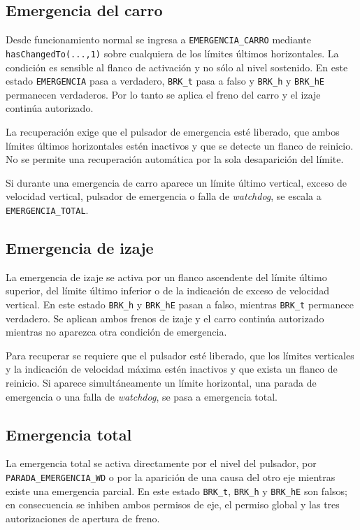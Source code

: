 \documentclass[a4paper,10pt,onecolumn,journal]{ieeeconf}
\numberwithin{equation}{section}
\begin{document}

\subsection{Emergencia del carro}
Desde funcionamiento normal se ingresa a \texttt{EMERGENCIA\_CARRO} mediante \texttt{hasChangedTo(...,1)} sobre cualquiera de los límites últimos horizontales. La condición es sensible al flanco de activación y no sólo al nivel sostenido. En este estado \texttt{EMERGENCIA} pasa a verdadero, \texttt{BRK\_t} pasa a falso y \texttt{BRK\_h} y \texttt{BRK\_hE} permanecen verdaderos. Por lo tanto se aplica el freno del carro y el izaje continúa autorizado.

La recuperación exige que el pulsador de emergencia esté liberado, que ambos límites últimos horizontales estén inactivos y que se detecte un flanco de reinicio. No se permite una recuperación automática por la sola desaparición del límite.

Si durante una emergencia de carro aparece un límite último vertical, exceso de velocidad vertical, pulsador de emergencia o falla de \textit{watchdog}, se escala a \texttt{EMERGENCIA\_TOTAL}.


\subsection{Emergencia de izaje}
La emergencia de izaje se activa por un flanco ascendente del límite último superior, del límite último inferior o de la indicación de exceso de velocidad vertical. En este estado \texttt{BRK\_h} y \texttt{BRK\_hE} pasan a falso, mientras \texttt{BRK\_t} permanece verdadero. Se aplican ambos frenos de izaje y el carro continúa autorizado mientras no aparezca otra condición de emergencia.

Para recuperar se requiere que el pulsador esté liberado, que los límites verticales y la indicación de velocidad máxima estén inactivos y que exista un flanco de reinicio. Si aparece simultáneamente un límite horizontal, una parada de emergencia o una falla de \textit{watchdog}, se pasa a emergencia total.


\subsection{Emergencia total}
La emergencia total se activa directamente por el nivel del pulsador, por \texttt{PARADA\_EMERGENCIA\_WD} o por la aparición de una causa del otro eje mientras existe una emergencia parcial. En este estado \texttt{BRK\_t}, \texttt{BRK\_h} y \texttt{BRK\_hE} son falsos; en consecuencia se inhiben ambos permisos de eje, el permiso global y las tres autorizaciones de apertura de freno.
\end{document}
